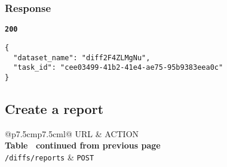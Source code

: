 \subsubsection{Response}
\textbf{\texttt{200}}
\begin{lstlisting}
{
  "dataset_name": "diff2F4ZLMgNu",
  "task_id": "cee03499-41b2-41e4-ae75-95b9383eea0c"
}
\end{lstlisting}

\subsection{Create a report}

\begin{longtable}[c]{@{}p{7.5cm}p{7.5cm}l@{}}
  \toprule
  URL                     & ACTION                            \\* \midrule
  \endfirsthead
  \multicolumn{3}{c}%
  {{\bfseries Table \thetable\ continued from previous page}} \\
  \endhead
  \bottomrule
  \endfoot
  \endlastfoot
  \texttt{/diffs/reports} & \texttt{POST}                     \\* \bottomrule
  \label{tab:rdf-differ-create-report}                        \\
\end{longtable}


